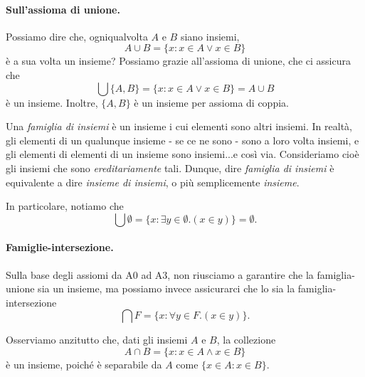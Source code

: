 \paragraph{Sull'assioma di unione.} Possiamo dire che, ogniqualvolta \(A\) e \(B\) siano insiemi,
\begin{equation}
  A \cup B = \lbrace x \colon x \in A \lor x \in B \rbrace
\end{equation}
è a sua volta un insieme? Possiamo grazie all'assioma di unione, che ci assicura che
\begin{equation}
  \bigcup \lbrace A, B \rbrace = \lbrace x \colon x \in A \lor x \in B \rbrace = A \cup B
\end{equation}
è un insieme. Inoltre, \(\lbrace A, B \rbrace\) è un insieme per assioma di coppia.

\begin{dfn}
  Una \emph{famiglia di insiemi} è un insieme i cui elementi sono altri insiemi. In realtà, gli elementi di un qualunque insieme - se ce ne sono - sono a loro volta insiemi, e gli elementi di elementi di un insieme sono insiemi...e così via. Consideriamo cioè gli insiemi che sono \emph{ereditariamente} tali. Dunque, dire \emph{famiglia di insiemi} è equivalente a dire \emph{insieme di insiemi}, o più semplicemente \emph{insieme}.
\end{dfn}

In particolare, notiamo che
\begin{equation}
  \bigcup\emptyset = \lbrace x \colon \exists y \in \emptyset. (x \in y) \rbrace = \emptyset.
\end{equation}

\paragraph{Famiglie-intersezione.} Sulla base degli assiomi da A0 ad A3, non riusciamo a garantire che la famiglia-unione sia un insieme, ma possiamo invece assicurarci che lo sia la famiglia-intersezione
\begin{equation}
  \bigcap F = \lbrace x \colon \forall y \in F. (x \in y) \rbrace.
\end{equation}

Osserviamo anzitutto che, dati gli insiemi \(A\) e \(B\), la collezione
\begin{equation}
  A \cap B = \lbrace x \colon x \in A \land x \in B \rbrace
\end{equation}
è un insieme, poiché è separabile da \(A\) come \(\lbrace x \in A \colon x \in B \rbrace\).

